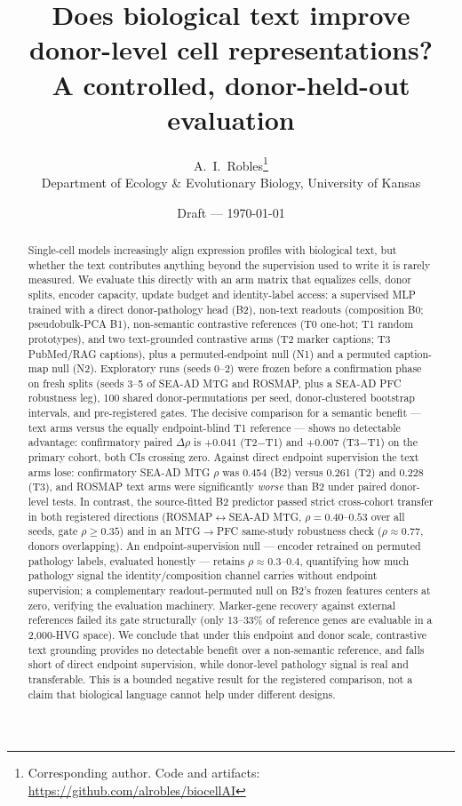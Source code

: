\documentclass[11pt]{article}
\title{Does biological text improve donor-level cell representations?\\
  A controlled, donor-held-out evaluation}
\author{A.~I.~Robles\thanks{Corresponding author. Code and artifacts:
  \url{https://github.com/alrobles/biocellAI}}\\
  Department of Ecology \& Evolutionary Biology, University of Kansas}
\date{Draft — \today}
\begin{document}
\maketitle

\begin{abstract}
Single-cell models increasingly align expression profiles with biological
text, but whether the text contributes anything beyond the supervision used
to write it is rarely measured. We evaluate this directly with an
arm matrix that equalizes cells, donor splits, encoder capacity, update
budget and identity-label access: a supervised MLP trained with a direct
donor-pathology head (B2), non-text readouts (composition B0;
pseudobulk-PCA B1), non-semantic contrastive references (T0 one-hot;
T1 random prototypes), and two text-grounded contrastive arms (T2 marker
captions; T3 PubMed/RAG captions), plus a permuted-endpoint null (N1)
and a permuted caption-map null (N2). Exploratory runs (seeds 0--2) were
frozen before a confirmation phase on fresh splits (seeds 3--5 of SEA-AD
MTG and ROSMAP, plus a SEA-AD PFC robustness leg), 100 shared
donor-permutations per seed, donor-clustered bootstrap intervals, and
pre-registered gates. The decisive comparison for a semantic benefit ---
text arms versus the equally endpoint-blind T1 reference --- shows no
detectable advantage: confirmatory paired $\Delta\rho$ is $+0.041$
(T2$-$T1) and $+0.007$ (T3$-$T1) on the primary cohort, both CIs
crossing zero. Against direct endpoint supervision the text arms lose:
confirmatory SEA-AD MTG $\rho$ was 0.454 (B2) versus 0.261 (T2) and
0.228 (T3), and ROSMAP text arms were significantly \emph{worse} than
B2 under paired donor-level tests. In contrast, the source-fitted B2
predictor passed strict cross-cohort transfer in both registered
directions (ROSMAP$\leftrightarrow$SEA-AD MTG, $\rho=0.40$--$0.53$ over
all seeds, gate $\rho\geq0.35$) and in an MTG$\to$PFC same-study
robustness check ($\rho\approx0.77$, donors overlapping). An
endpoint-supervision null --- encoder retrained on permuted pathology
labels, evaluated honestly --- retains $\rho\approx0.3$--$0.4$,
quantifying how much pathology signal the identity/composition channel
carries without endpoint supervision; a complementary readout-permuted
null on B2's frozen features centers at zero, verifying the evaluation
machinery. Marker-gene recovery against external references failed its
gate structurally (only 13--33\% of reference genes are evaluable in a
2{,}000-HVG space). We conclude that under this endpoint and donor
scale, contrastive text grounding provides no detectable benefit over a
non-semantic reference, and falls short of direct endpoint supervision,
while donor-level pathology signal is real and transferable. This is a
bounded negative result for the registered comparison, not a claim that
biological language cannot help under different designs.
\end{abstract}
\end{document}
